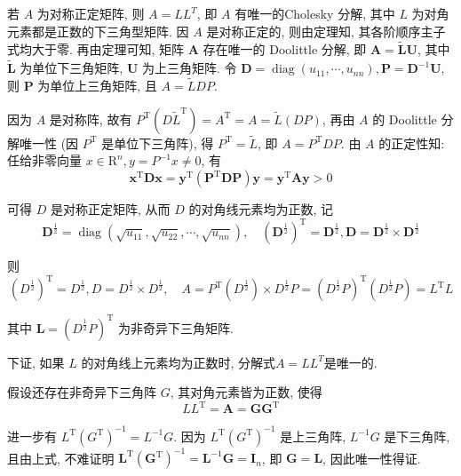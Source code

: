   \begin{tcolorbox}[enhanced,colback=10,colframe=9,breakable,coltitle=green!25!black,title=2024]
  
若 $A$ 为对称正定矩阵, 则 $ A=L L^{T} $, 即 $ A $ 有唯一的Cholesky 分解, 其中 $ L $ 为对角元素都是正数的下三角型矩阵.
\tcblower
 因 $ A $ 是对称正定的, 则由定理知, 其各阶顺序主子式均大于零. 再由定理可知, 矩阵 $ \boldsymbol{A} $ 存在唯一的 Doolittle 分解, 即 $ \boldsymbol{A}=\tilde{\boldsymbol{L}} \boldsymbol{U} $, 其中 $ \tilde{\boldsymbol{L}} $ 为单位下三角矩阵, $ \boldsymbol{U} $ 为上三角矩阵. 令 $ \boldsymbol{D}=\operatorname{diag}\left(u_{11}, \cdots, u_{n n}\right), \boldsymbol{P}=\boldsymbol{D}^{-1} \boldsymbol{U} $, 则 $ \boldsymbol{P} $ 为单位上三角矩阵, 且 $ A=\tilde{L} D P $.

因为 $ A $ 是对称阵, 故有 $ P^{\mathrm{T}}\left(D \tilde{L}^{\mathrm{T}}\right)=A^{\mathrm{T}}=A=\tilde{L}(D P) $, 再由 $ A $ 的 Doolittle 分解唯一性 (因 $ P^{\mathrm{T}} $ 是单位下三角阵), 得 $ P^{\mathrm{T}}=\widetilde{L} $, 即 $ A=P^{\mathrm{T}} D P $.
由 $ A $ 的正定性知: 任给非零向量 $ x \in \mathrm{R}^{n}, y=P^{-1} x \neq 0 $, 有
$$
\boldsymbol{x}^{\mathrm{T}} \boldsymbol{D} \boldsymbol{x}=\boldsymbol{y}^{\mathrm{T}}\left(\boldsymbol{P}^{\mathrm{T}} \boldsymbol{D} \boldsymbol{P}\right) \boldsymbol{y}=\boldsymbol{y}^{\mathrm{T}} \boldsymbol{A} \boldsymbol{y}>0
$$

可得 $ D $ 是对称正定矩阵, 从而 $ D $ 的对角线元素均为正数, 记
$$
\boldsymbol{D}^{\frac{1}{2}}=\operatorname{diag}\left(\sqrt{u_{11}}, \sqrt{u_{22}}, \cdots, \sqrt{u_{n n}}\right), \quad\left(\boldsymbol{D}^{\frac{1}{2}}\right)^{\mathrm{T}}=\boldsymbol{D}^{\frac{1}{2}}, \boldsymbol{D}=\boldsymbol{D}^{\frac{1}{2}} \times \boldsymbol{D}^{\frac{1}{2}}
$$

则
$$
\left(D^{\frac{1}{2}}\right)^{\mathrm{T}}=D^{\frac{1}{2}}, D=D^{\frac{1}{2}} \times D^{\frac{1}{2}}, \quad A=P^{\mathrm{T}}\left(D^{\frac{1}{2}}\right) \times D^{\frac{1}{2}} P=\left(D^{\frac{1}{2}} P\right)^{\mathrm{T}}\left(D^{\frac{1}{2}} P\right)=L^{\mathrm{T}} L
$$

其中 $ \boldsymbol{L}=\left(D^{\frac{1}{2}} P\right)^{\mathrm{T}} $ 为非奇异下三角矩阵.

下证, 如果 $ L $ 的对角线上元素均为正数时, 分解式$ A=L L^{T} $是唯一的.

假设还存在非奇异下三角阵 $ G $, 其对角元素皆为正数, 使得
$$
L L^{\mathrm{T}}=\boldsymbol{A}=\boldsymbol{G} \boldsymbol{G}^{\mathrm{T}}
$$

进一步有 $ L^{\mathrm{T}}\left(G^{\mathrm{T}}\right)^{-1}=L^{-1} G $. 因为 $ L^{\mathrm{T}}\left(G^{\mathrm{T}}\right)^{-1} $ 是上三角阵, $ L^{-1} G $ 是下三角阵, 且由上式, 不难证明 $ \boldsymbol{L}^{\mathrm{T}}\left(\boldsymbol{G}^{\mathrm{T}}\right)^{-1}=\boldsymbol{L}^{-1} \boldsymbol{G}=\boldsymbol{I}_{n} $, 即 $ \boldsymbol{G}=\boldsymbol{L} $, 因此唯一性得证.

\end{tcolorbox}


